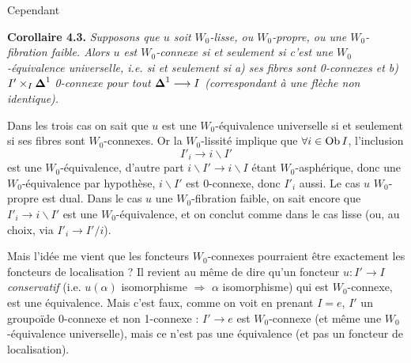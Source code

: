 Cependant

\textbf{Corollaire 4.3.} \textit{Supposons que $u$ soit $W_0$-lisse, ou $W_0$-propre, ou une $W_0$-fibration faible. Alors $u$ est $W_0$-connexe si et seulement si c'est une $W_0$-équivalence universelle, i.e. si et seulement si a) ses fibres sont \textup{0}-connexes et b) $I' \times_I \boldsymbol{\Delta}^1$} \textit{\textup{0}-connexe pour tout $\boldsymbol{\Delta}^1 \longrightarrow I$ (correspondant à une flèche non identique).}

Dans les trois cas on sait que $u$ est une $W_0$-équivalence universelle si et seulement si ses fibres sont $W_0$-connexes. Or la $W_0$-lissité implique que $\forall i \in \operatorname{Ob} I$, l'inclusion
\[
I'_i \longrightarrow i\backslash I'
\]
est une $W_0$-équivalence, d'autre part $i\backslash I' \longrightarrow i\backslash I$ étant $W_0$-asphérique, donc une $W_0$-équivalence par hypothèse, $i\backslash I'$ est 0-connexe, donc $I'_i$ aussi. Le cas $u$ $W_0$-propre est dual. Dans le cas $u$ une $W_0$-fibration faible, on sait encore que $I'_i \longrightarrow i\backslash I'$ est une $W_0$-équivalence, et on conclut comme dans le cas lisse (ou, au choix, via $I'_i \longrightarrow I'/i$).

Mais l'idée me vient que les foncteurs $W_0$-connexes pourraient être exactement les foncteurs de localisation ? Il revient au même de dire qu'un foncteur $u : I' \longrightarrow I$ \textit{conservatif} (i.e. $u(\alpha)$ isomorphisme $\Longrightarrow$ $\alpha$ isomorphisme) qui est $W_0$-connexe, est une équivalence. Mais c'est faux, comme on voit en prenant $I = e$, $I'$ un groupoïde 0-connexe et non 1-connexe : $I' \longrightarrow e$ est $W_0$-connexe (et même une $W_0$-équivalence universelle), mais ce n'est pas une équivalence (et pas un foncteur de localisation).

